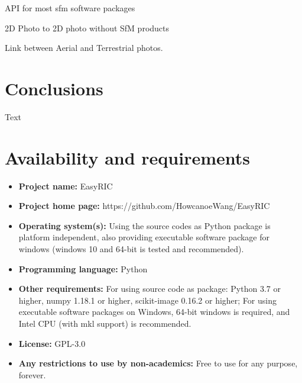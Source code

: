 \documentclass{configs/bmcart}
\begin{document}
API for most \acrshort*{sfm} software packages

2D Photo to 2D photo without SfM products

Link between Aerial and Terrestrial photos.

\section*{Conclusions}
Text

\section*{Availability and requirements}
\begin{itemize}
  \item \textbf{Project name:} EasyRIC
  \item \textbf{Project home page:} https://github.com/HowcanoeWang/EasyRIC
  \item \textbf{Operating system(s):} Using the source codes as Python package is platform independent, also providing executable software package for windows (windows 10 and 64-bit is tested and recommended).
  \item \textbf{Programming language: } Python
  \item \textbf{Other requirements:} For using source code as package: Python 3.7 or higher, numpy 1.18.1 or higher, scikit-image 0.16.2 or higher; For using executable software packages on Windows, 64-bit windows is required, and Intel CPU (with mkl support) is recommended.
  \item \textbf{License:} GPL-3.0
  \item \textbf{Any restrictions to use by non-academics:} Free to use for any purpose, forever.
\end{itemize}


\end{document}
